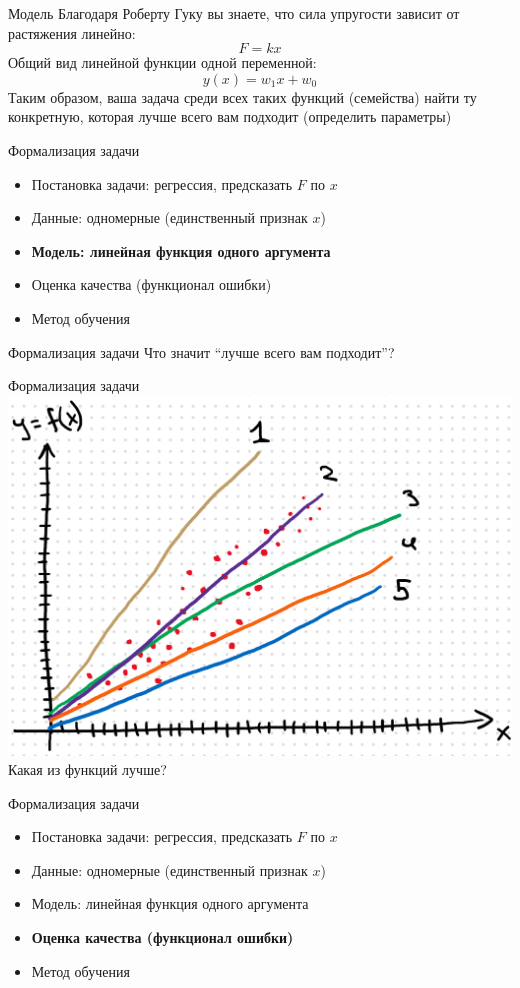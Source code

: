 \documentclass[aspectratio=169]{beamer}
\begin{document}
\begin{frame}{Модель}
    Благодаря Роберту Гуку вы знаете, что сила упругости зависит от растяжения линейно:
    {\LARGE \[ F = k x \]}
    \pause
    Общий вид линейной функции одной переменной:
    {\LARGE \[ y(x) = w_1 x + w_0 \]}
    \pause
    Таким образом, ваша задача среди всех таких функций (семейства) найти ту конкретную,
    которая лучше всего вам подходит (определить параметры)
\end{frame}

\begin{frame}{Формализация задачи}
    \begin{itemize}
        \item Постановка задачи: регрессия, предсказать \( F \) по \( x \)
        \item Данные: одномерные (единственный признак \( x \))
        \item \textbf{Модель: линейная функция одного аргумента}
        \item Оценка качества (функционал ошибки)
        \item Метод обучения
    \end{itemize}
\end{frame}

\begin{frame}{Формализация задачи}
    \centering
    {\Large Что значит ``лучше всего вам подходит''?}
\end{frame}

\begin{frame}{Формализация задачи}
    \centering
    \includegraphics[width=.54\linewidth]{graphs/fig4.png} \\
    Какая из функций лучше?
\end{frame}

\begin{frame}{Формализация задачи}
    \begin{itemize}
        \item Постановка задачи: регрессия, предсказать \( F \) по \( x \)
        \item Данные: одномерные (единственный признак \( x \))
        \item Модель: линейная функция одного аргумента
        \item \textbf{Оценка качества (функционал ошибки)}
        \item Метод обучения
    \end{itemize}
\end{frame}
\end{document}
